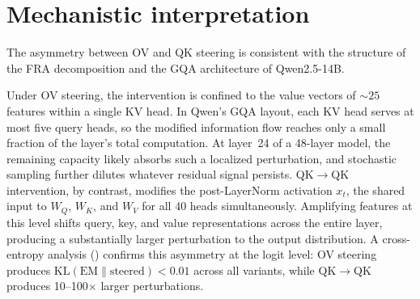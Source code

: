 \documentclass{article}
\theoremstyle{plain}
\theoremstyle{definition}
\theoremstyle{remark}
\newcommand{\WQ}{W_Q}
\newcommand{\WK}{W_K}
\newcommand{\WV}{W_V}
\begin{document}



\section{Mechanistic interpretation}
\label{sec:mechanistic}

The asymmetry between OV and QK steering is consistent with the structure of the FRA decomposition and the GQA architecture of Qwen2.5-14B.

Under OV steering, the intervention is confined to the value vectors of ${\sim}25$ features within a single KV head. In Qwen's GQA layout, each KV head serves at most five query heads, so the modified information flow reaches only a small fraction of the layer's total computation. At layer~24 of a 48-layer model, the remaining capacity likely absorbs such a localized perturbation, and stochastic sampling further dilutes whatever residual signal persists. QK$\to$QK intervention, by contrast, modifies the post-LayerNorm activation $x_t$, the shared input to $\WQ$, $\WK$, and $\WV$ for all 40 heads simultaneously. Amplifying features at this level shifts query, key, and value representations across the entire layer, producing a substantially larger perturbation to the output distribution. A cross-entropy analysis () confirms this asymmetry at the logit level: OV steering produces $\mathrm{KL}(\text{EM} \| \text{steered}) < 0.01$ across all variants, while QK$\to$QK produces 10--100$\times$ larger perturbations.
\end{document}
